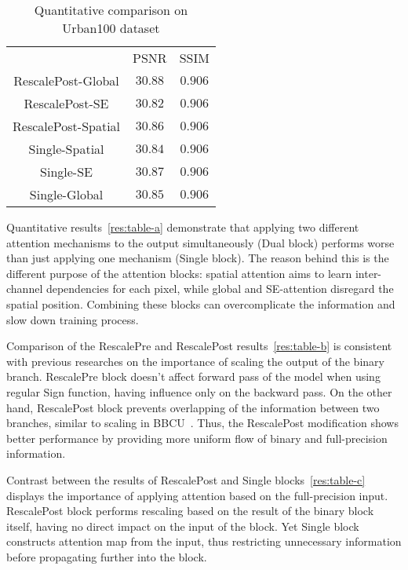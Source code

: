 \documentclass{article}
\begin{document}
\begin{table}[t]
\begin{subtable}{.5\linewidth}
\begin{tabular}{ |c|c|c| }
            & PSNR & SSIM \\ 
            RescalePost-Global & $30.88$ & $0.906$ \\
            RescalePost-SE & $30.82$ & $0.906$ \\
            RescalePost-Spatial & $30.86$ & $0.906$ \\
            Single-Spatial & $30.84$ & $0.906$ \\
            Single-SE & $30.87$ & $0.906$ \\
            Single-Global & $30.85$ & $0.906$ \\
        
         \hline
        \end{tabular}
    \label{res:table-c}
    \end{subtable}
    \caption{Quantitative comparison on Urban100 dataset}
    \label{res:table}
\end{table}

Quantitative results~\ref{res:table-a} demonstrate that applying two different attention mechanisms to the output simultaneously (Dual block) performs worse than just applying one mechanism (Single block). The reason behind this is the different purpose of the attention blocks: spatial attention aims to learn inter-channel dependencies for each pixel, while global and SE-attention disregard the spatial position. Combining these blocks can overcomplicate the information and slow down training process.

Comparison of the RescalePre and RescalePost results~\ref{res:table-b} is consistent with previous researches on the importance of scaling the output of the binary branch. RescalePre block doesn't affect forward pass of the model when using regular Sign function, having influence only on the backward pass. On the other hand, RescalePost block prevents overlapping of the information between two branches, similar to scaling in BBCU~\cite{xia2022basic}. Thus, the RescalePost modification shows better performance by providing more uniform flow of binary and full-precision information.

Contrast between the results of RescalePost and Single blocks~\ref{res:table-c} displays the importance of applying attention based on the full-precision input. RescalePost block performs rescaling based on the result of the binary block itself, having no direct impact on the input of the block. Yet Single block constructs attention map from the input, thus restricting unnecessary information before propagating further into the block. 
\end{document}
